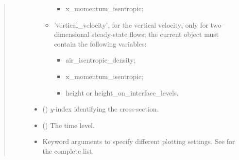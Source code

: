 \documentclass[letterpaper,10pt,english]{sphinxmanual}
\begin{document}
\begin{fulllineitems}
\begin{fulllineitems}
\begin{quote}
\begin{description}
\begin{itemize}
\begin{itemize}
\begin{itemize}
\item {} 
x\_momentum\_isentropic;

\end{itemize}

\item {} 
’vertical\_velocity’, for the vertical velocity; only for two-dimensional steady-state flows;                          the current object must contain the following variables:
\begin{itemize}
\item {} 
air\_isentropic\_density;

\item {} 
x\_momentum\_isentropic;

\item {} 
height or height\_on\_interface\_levels.

\end{itemize}

\end{itemize}


\item {} 
 () \textendash{} \(y\)-index identifying the cross-section.

\item {} 
 () \textendash{} The time level.

\item {} 
 \textendash{} Keyword arguments to specify different plotting settings.
See {\hyperref[\detokenize{api:tasmania.utils.utils_plot.contour_xz}]{}} for the complete list.

\end{itemize}

\end{description}\end{quote}

\end{fulllineitems}



\end{fulllineitems}
\end{document}
